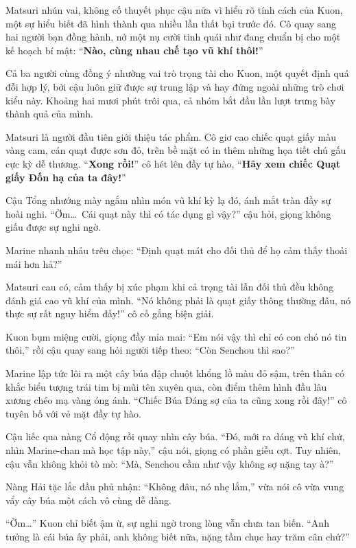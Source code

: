 \documentclass[../main.tex]{subfiles}
\begin{document}
Matsuri nhún vai, không cố thuyết phục cậu nữa vì hiểu rõ tính cách của Kuon, một sự hiểu biết đã hình thành qua nhiều lần thất bại trước đó. Cô quay sang hai người bạn đồng hành, nở một nụ cười tinh quái như đang chuẩn bị cho một kế hoạch bí mật: ``\textbf{Nào, cùng nhau chế tạo vũ khí thôi!}''

\ct

Cả ba người cùng đồng ý nhường vai trò trọng tài cho Kuon, một quyết định quá đỗi hợp lý, bởi cậu luôn giữ được sự trung lập và hay đứng ngoài những trò chơi kiểu này. Khoảng hai mươi phút trôi qua, cả nhóm bắt đầu lần lượt trưng bày thành quả của mình.

Matsuri là người đầu tiên giới thiệu tác phẩm. Cô giơ cao chiếc quạt giấy màu vàng cam, cán quạt được sơn đỏ, trên bề mặt có in thêm những họa tiết chú gấu cực kỳ dễ thương. ``\textbf{Xong rồi!}'' cô hét lên đầy tự hào, ``\textbf{Hãy xem chiếc Quạt giấy Đốn hạ của ta đây!}''

Cậu Tổng nhướng mày ngắm nhìn món vũ khí kỳ lạ đó, ánh mắt tràn đầy sự hoài nghi. ``Ờm\dots\ Cái quạt này thì có tác dụng gì vậy?'' cậu hỏi, giọng không giấu được sự nghi ngờ.

Marine nhanh nhảu trêu chọc: ``Định quạt mát cho đối thủ để họ cảm thấy thoải mái hơn hả?''

Matsuri cau có, cảm thấy bị xúc phạm khi cả trọng tài lẫn đối thủ đều không đánh giá cao vũ khí của mình. ``Nó không phải là quạt giấy thông thường đâu, nó thực sự rất nguy hiểm đấy!'' cô cố gắng biện giải.

Kuon bụm miệng cười, giọng đầy mỉa mai: ``Em nói vậy thì chỉ có con chó nó tin thôi,'' rồi cậu quay sang hỏi người tiếp theo: ``Còn Senchou thì sao?''

Marine lập tức lôi ra một cây búa đập chuột khổng lồ màu đỏ sậm, trên thân có khắc biểu tượng trái tim bị mũi tên xuyên qua, còn điểm thêm hình đầu lâu xương chéo mạ vàng óng ánh. ``Chiếc Búa Đáng sợ của ta cũng xong rồi đây!'' cô tuyên bố với vẻ mặt đầy tự hào.

Cậu liếc qua nàng Cổ động rồi quay nhìn cây búa. ``Đó, mới ra dáng vũ khí chứ, nhìn Marine-chan mà học tập này,'' cậu nói, giọng có phần giễu cợt. Tuy nhiên, cậu vẫn không khỏi tò mò: ``Mà, Senchou cầm như vậy không sợ nặng tay à?''

Nàng Hải tặc lắc đầu phủ nhận: ``Không đâu, nó nhẹ lắm,'' vừa nói cô vừa vung vẩy cây búa một cách vô cùng dễ dàng.

``Ờm\dots'' Kuon chỉ biết ậm ừ, sự nghi ngờ trong lòng vẫn chưa tan biến. ``Anh tưởng là cái búa ấy phải, anh không biết nữa, nặng tầm chục hay trăm cân chứ?''
\end{document}
